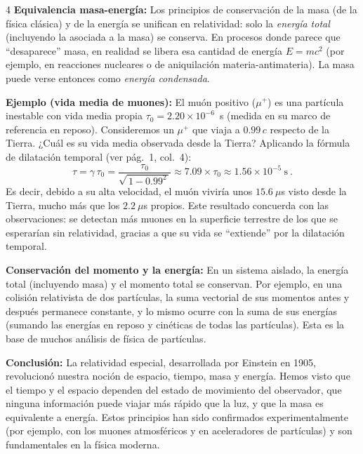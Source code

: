 \documentclass[landscape,10pt]{article}
\begin{document}
\begin{multicols}{4}
\medskip \noindent \textbf{Equivalencia masa-energía:} Los principios de conservación de la masa (de la física clásica) y de la energía se unifican en relatividad: solo la \emph{energía total} (incluyendo la asociada a la masa) se conserva. En procesos donde parece que “desaparece” masa, en realidad se libera esa cantidad de energía $E = m c^2$ (por ejemplo, en reacciones nucleares o de aniquilación materia-antimateria). La masa puede verse entonces como \emph{energía condensada}.

\columnbreak
\noindent \textbf{Ejemplo (vida media de muones):} El muón positivo ($\mu^+$) es una partícula inestable con vida media propia $\tau_0 = 2.20\times 10^{-6}$~s (medida en su marco de referencia en reposo). Consideremos un $\mu^+$ que viaja a $0.99\,c$ respecto de la Tierra. ¿Cuál es su vida media observada desde la Tierra? Aplicando la fórmula de dilatación temporal (ver pág.~1, col.~4):
\[
\tau = \gamma\, \tau_0 = \frac{\tau_0}{\sqrt{\,1-0.99^2\,}} \approx 7.09 \times \tau_0 \approx 1.56\times 10^{-5}~\text{s}~.
\] 
Es decir, debido a su alta velocidad, el muón viviría unos $15.6~\mu$s visto desde la Tierra, mucho más que los $2.2~\mu$s propios. Este resultado concuerda con las observaciones: se detectan más muones en la superficie terrestre de los que se esperarían sin relatividad, gracias a que su vida se “extiende” por la dilatación temporal.

\medskip \noindent \textbf{Conservación del momento y la energía:} En un sistema aislado, la energía total (incluyendo masa) y el momento total se conservan. Por ejemplo, en una colisión relativista de dos partículas, la suma vectorial de sus momentos antes y después permanece constante, y lo mismo ocurre con la suma de sus energías (sumando las energías en reposo y cinéticas de todas las partículas). Esta es la base de muchos análisis de física de partículas.

\medskip \noindent \textbf{Conclusión:} La relatividad especial, desarrollada por Einstein en 1905, revolucionó nuestra noción de espacio, tiempo, masa y energía. Hemos visto que el tiempo y el espacio dependen del estado de movimiento del observador, que ninguna información puede viajar más rápido que la luz, y que la masa es equivalente a energía. Estos principios han sido confirmados experimentalmente (por ejemplo, con los muones atmosféricos y en aceleradores de partículas) y son fundamentales en la física moderna.

\end{multicols}
\end{document}
